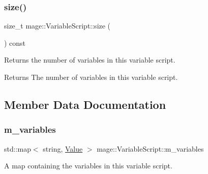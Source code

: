 \subsubsection{\texorpdfstring{size()}{size()}}
{\footnotesize\ttfamily size\+\_\+t mage\+::\+Variable\+Script\+::size (\begin{DoxyParamCaption}{ }\end{DoxyParamCaption}) const\hspace{0.3cm}{\ttfamily [noexcept]}}

Returns the number of variables in this variable script.

\begin{DoxyReturn}{Returns}
The number of variables in this variable script. 
\end{DoxyReturn}


\subsection{Member Data Documentation}
\hypertarget{classmage_1_1_variable_script_aed925cedf17c486fad876764e53d9e04}{}\label{classmage_1_1_variable_script_aed925cedf17c486fad876764e53d9e04} 
\subsubsection{\texorpdfstring{m\+\_\+variables}{m\_variables}}
{\footnotesize\ttfamily std\+::map$<$ string, \hyperlink{namespacemage_aa1fe0628487e0706e44efdc62dbdb3a2}{Value} $>$ mage\+::\+Variable\+Script\+::m\+\_\+variables\hspace{0.3cm}{\ttfamily [private]}}

A map containing the variables in this variable script. 